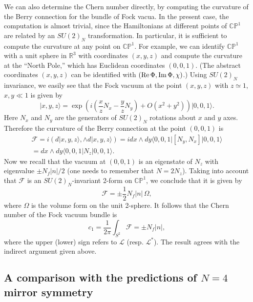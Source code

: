 \documentclass[a4paper,12pt, amsfonts, amssymb]{article}
\newcommand{\CC}{{\mathbb C}}
\newcommand{\RR}{{\mathbb R}}
\newcommand{\PP}{{\mathbb P}}
\renewcommand{\L}{{\mathcal L}}
\newcommand{\F}{{\mathcal F}}
\begin{document}
We can also determine the Chern number directly, by computing the curvature
of the Berry connection for the bundle of Fock vacua. In the present case,
the computation is almost trivial, since the Hamiltonians at different points
of $\CC\PP^1$ are related by an $SU(2)_N$ transformation. In particular,
it is sufficient to compute the curvature at any point on $\CC\PP^1$.
For example, we can identify $\CC\PP^1$ with a unit sphere in $\RR^3$
with coordinates $(x,y,z)$ and compute the curvature at the
``North Pole,'' which has Euclidean coordinates $(0,0,1)$. (The abstract
coordinates $(x,y,z)$ can be identified with $({\rm Re\,\Phi},
{\rm Im}\,\Phi,\chi)$.)
Using $SU(2)_N$ invariance,
we easily see that the Fock vacuum at the point $(x,y,z)$ with $z\simeq 1$,
$x,y\ll 1$ is given by
$$
\vert x,y,z\rangle=\exp\left(i\left(\frac{x}{z} N_x-\frac{y}{z} N_y\right)+
O(x^2+y^2)\right)\vert 0,0,1\rangle.
$$
Here $N_x$ and $N_y$ are the generators of $SU(2)_N$ rotations about
$x$ and $y$ axes. Therefore the curvature of the Berry connection 
at the point $(0,0,1)$ is
\begin{multline*}
\F=i\left(d\vert x,y,z\rangle, \wedge d\vert x,y,z\rangle\right)=
i dx\wedge dy \langle 0,0,1\vert [N_y,N_x]\vert 0,0,1\rangle\\
=dx\wedge dy \langle 0,0,1\vert N_z\vert 0,0,1\rangle.
\end{multline*}
Now we recall that the vacuum at $(0,0,1)$ is an eigenstate of $N_z$
with eigenvalue $\pm N_f|n|/2$ (one needs to remember that $N=2N_z$).
Taking into account that $\F$ is 
an $SU(2)_N$-invariant 2-form on $\CC\PP^1$, we conclude that it is
given by
$$
\F=\pm\frac{1}{2}N_f|n|\, \Omega,
$$
where $\Omega$ is the volume form on the unit 2-sphere. It follows that
the Chern number of the Fock vacuum bundle is
$$
c_1=\frac{1}{2\pi} \int_{S^2} \F=\pm N_f|n|,
$$
where the upper (lower) sign refers to $\L$ (resp. $\L^*$).
The result agrees with the indirect argument given above.

\subsection{A comparison with the predictions of $N=4$ mirror symmetry}
\end{document}
